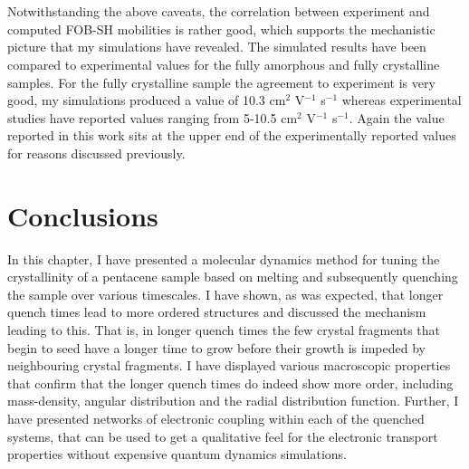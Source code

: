\\\\
Notwithstanding the above caveats, the correlation between experiment and computed FOB-SH mobilities is rather good, which supports the mechanistic picture that my simulations have revealed. The simulated results have been compared to experimental values for the fully amorphous and fully crystalline samples. For the fully crystalline sample the agreement to experiment is very good, my simulations produced a value of 10.3 cm$^2$ V$^{-1}$ s$^{-1}$ whereas experimental studies have reported values ranging from 5-10.5 cm$^2$ V$^{-1}$ s$^{-1}$. Again the value reported in this work sits at the upper end of the experimentally reported values for reasons discussed previously.

\section{Conclusions}
In this chapter, I have presented a molecular dynamics method for tuning the crystallinity of a pentacene sample based on melting and subsequently quenching the sample over various timescales. I have shown, as was expected, that longer quench times lead to more ordered structures and discussed the mechanism leading to this. That is, in longer quench times the few crystal fragments that begin to seed have a longer time to grow before their growth is impeded by neighbouring crystal fragments. I have displayed various macroscopic properties that confirm that the longer quench times do indeed show more order, including mass-density, angular distribution and the radial distribution function. Further, I have presented networks of electronic coupling within each of the quenched systems, that can be used to get a qualitative feel for the electronic transport properties without expensive quantum dynamics simulations.
\\\\
